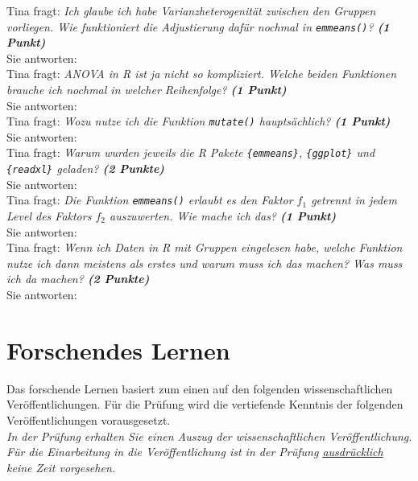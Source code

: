 \documentclass[a4paper, 9pt]{scrartcl}\usepackage[]{graphicx}\usepackage[]{xcolor}
\begin{document}
Tina fragt: \textit{Ich glaube ich habe Varianzheterogenität zwischen den Gruppen vorliegen. Wie funktioniert die Adjustierung dafür nochmal in  \texttt{emmeans()}? \textbf{(1 Punkt)}}\\[1ex]
Sie antworten:\\[2Ex]

Tina fragt: \textit{ANOVA in R ist ja nicht so kompliziert. Welche beiden Funktionen brauche ich nochmal in welcher Reihenfolge? \textbf{(1 Punkt)}}\\[1ex]
Sie antworten:\\[2Ex]

Tina fragt: \textit{Wozu nutze ich die Funktion \texttt{mutate()} hauptsächlich? \textbf{(1 Punkt)}}\\[1ex]
Sie antworten:\\[2Ex]

Tina fragt: \textit{Warum wurden jeweils die R Pakete \texttt{\{emmeans\}}, \texttt{\{ggplot\}} und \texttt{\{readxl\}} geladen? \textbf{(2 Punkte)}}\\[1ex]
Sie antworten:\\[2Ex]

Tina fragt: \textit{Die Funktion \texttt{emmeans()} erlaubt es den Faktor $f_1$ getrennt in jedem Level des Faktors $f_2$ auszuwerten. Wie mache ich das? \textbf{(1 Punkt)}}\\[1ex]
Sie antworten:\\[2Ex]

Tina fragt: \textit{Wenn ich Daten in R mit Gruppen eingelesen habe, welche Funktion nutze ich dann meistens als erstes und warum muss ich das machen? Was muss ich da machen? \textbf{(2 Punkte)}}\\[1ex]
Sie antworten:\\[2Ex]



 
\clearpage
\part{Forschendes Lernen}

Das forschende Lernen basiert zum einen auf den folgenden wissenschaftlichen Veröffentlichungen. Für die Prüfung wird die vertiefende Kenntnis der folgenden Veröffentlichungen vorausgesetzt.\\

\textit{In der Prüfung erhalten Sie einen Auszug der wissenschaftlichen Veröffentlichung. Für die Einarbeitung in die Veröffentlichung ist in der Prüfung \underline{ausdrücklich} keine Zeit vorgesehen.}
\end{document}
